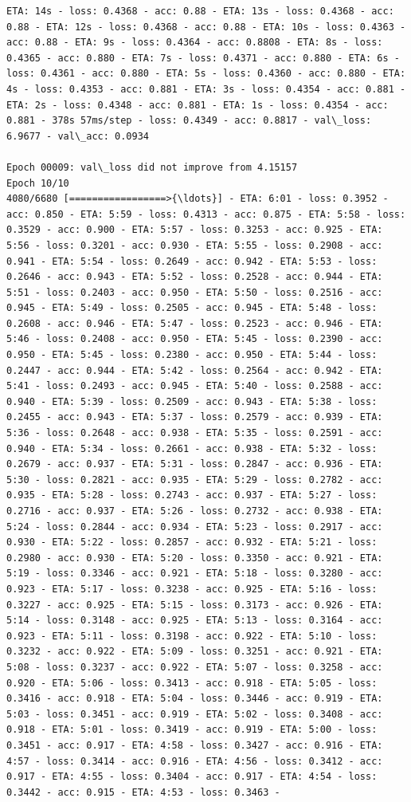 \documentclass[11pt]{article}
\begin{document}
\begin{Verbatim}[commandchars=\\\{\}]
ETA: 14s - loss: 0.4368 - acc: 0.88 - ETA: 13s - loss: 0.4368 - acc: 0.88 - ETA: 12s - loss: 0.4368 - acc: 0.88 - ETA: 10s - loss: 0.4363 - acc: 0.88 - ETA: 9s - loss: 0.4364 - acc: 0.8808 - ETA: 8s - loss: 0.4365 - acc: 0.880 - ETA: 7s - loss: 0.4371 - acc: 0.880 - ETA: 6s - loss: 0.4361 - acc: 0.880 - ETA: 5s - loss: 0.4360 - acc: 0.880 - ETA: 4s - loss: 0.4353 - acc: 0.881 - ETA: 3s - loss: 0.4354 - acc: 0.881 - ETA: 2s - loss: 0.4348 - acc: 0.881 - ETA: 1s - loss: 0.4354 - acc: 0.881 - 378s 57ms/step - loss: 0.4349 - acc: 0.8817 - val\_loss: 6.9677 - val\_acc: 0.0934

Epoch 00009: val\_loss did not improve from 4.15157
Epoch 10/10
4080/6680 [=================>{\ldots}] - ETA: 6:01 - loss: 0.3952 - acc: 0.850 - ETA: 5:59 - loss: 0.4313 - acc: 0.875 - ETA: 5:58 - loss: 0.3529 - acc: 0.900 - ETA: 5:57 - loss: 0.3253 - acc: 0.925 - ETA: 5:56 - loss: 0.3201 - acc: 0.930 - ETA: 5:55 - loss: 0.2908 - acc: 0.941 - ETA: 5:54 - loss: 0.2649 - acc: 0.942 - ETA: 5:53 - loss: 0.2646 - acc: 0.943 - ETA: 5:52 - loss: 0.2528 - acc: 0.944 - ETA: 5:51 - loss: 0.2403 - acc: 0.950 - ETA: 5:50 - loss: 0.2516 - acc: 0.945 - ETA: 5:49 - loss: 0.2505 - acc: 0.945 - ETA: 5:48 - loss: 0.2608 - acc: 0.946 - ETA: 5:47 - loss: 0.2523 - acc: 0.946 - ETA: 5:46 - loss: 0.2408 - acc: 0.950 - ETA: 5:45 - loss: 0.2390 - acc: 0.950 - ETA: 5:45 - loss: 0.2380 - acc: 0.950 - ETA: 5:44 - loss: 0.2447 - acc: 0.944 - ETA: 5:42 - loss: 0.2564 - acc: 0.942 - ETA: 5:41 - loss: 0.2493 - acc: 0.945 - ETA: 5:40 - loss: 0.2588 - acc: 0.940 - ETA: 5:39 - loss: 0.2509 - acc: 0.943 - ETA: 5:38 - loss: 0.2455 - acc: 0.943 - ETA: 5:37 - loss: 0.2579 - acc: 0.939 - ETA: 5:36 - loss: 0.2648 - acc: 0.938 - ETA: 5:35 - loss: 0.2591 - acc: 0.940 - ETA: 5:34 - loss: 0.2661 - acc: 0.938 - ETA: 5:32 - loss: 0.2679 - acc: 0.937 - ETA: 5:31 - loss: 0.2847 - acc: 0.936 - ETA: 5:30 - loss: 0.2821 - acc: 0.935 - ETA: 5:29 - loss: 0.2782 - acc: 0.935 - ETA: 5:28 - loss: 0.2743 - acc: 0.937 - ETA: 5:27 - loss: 0.2716 - acc: 0.937 - ETA: 5:26 - loss: 0.2732 - acc: 0.938 - ETA: 5:24 - loss: 0.2844 - acc: 0.934 - ETA: 5:23 - loss: 0.2917 - acc: 0.930 - ETA: 5:22 - loss: 0.2857 - acc: 0.932 - ETA: 5:21 - loss: 0.2980 - acc: 0.930 - ETA: 5:20 - loss: 0.3350 - acc: 0.921 - ETA: 5:19 - loss: 0.3346 - acc: 0.921 - ETA: 5:18 - loss: 0.3280 - acc: 0.923 - ETA: 5:17 - loss: 0.3238 - acc: 0.925 - ETA: 5:16 - loss: 0.3227 - acc: 0.925 - ETA: 5:15 - loss: 0.3173 - acc: 0.926 - ETA: 5:14 - loss: 0.3148 - acc: 0.925 - ETA: 5:13 - loss: 0.3164 - acc: 0.923 - ETA: 5:11 - loss: 0.3198 - acc: 0.922 - ETA: 5:10 - loss: 0.3232 - acc: 0.922 - ETA: 5:09 - loss: 0.3251 - acc: 0.921 - ETA: 5:08 - loss: 0.3237 - acc: 0.922 - ETA: 5:07 - loss: 0.3258 - acc: 0.920 - ETA: 5:06 - loss: 0.3413 - acc: 0.918 - ETA: 5:05 - loss: 0.3416 - acc: 0.918 - ETA: 5:04 - loss: 0.3446 - acc: 0.919 - ETA: 5:03 - loss: 0.3451 - acc: 0.919 - ETA: 5:02 - loss: 0.3408 - acc: 0.918 - ETA: 5:01 - loss: 0.3419 - acc: 0.919 - ETA: 5:00 - loss: 0.3451 - acc: 0.917 - ETA: 4:58 - loss: 0.3427 - acc: 0.916 - ETA: 4:57 - loss: 0.3414 - acc: 0.916 - ETA: 4:56 - loss: 0.3412 - acc: 0.917 - ETA: 4:55 - loss: 0.3404 - acc: 0.917 - ETA: 4:54 - loss: 0.3442 - acc: 0.915 - ETA: 4:53 - loss: 0.3463 - 
\end{Verbatim}
\end{document}
